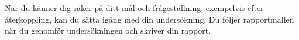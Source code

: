 \documentclass[a4paper]{miunasgn}
\begin{document}
När du känner dig säker på ditt mål och frågeställning, exempelvis efter 
återkoppling, kan du sätta igång med din undersökning.
Du följer rapportmallen när du genomför undersökningen och skriver din rapport.

\begin{comment}
The topic should be comparative analyses of (minimum two) different 
technologies.  Here are four possible alternatives: 

Compare two data communication standards. Explain their basic principles with 
your own words, and draw your own conclusions about their advantages and 
disadvantages, as well as which of them are expected to be improved in couple 
of years. http://wikipedia.org , and the course book can be used as resources.  
If there are RFCs for these standards (Request for Comments – which exist for 
the standards at the network and higher layers), read them. RFC are normally 
easy to read. The standards on physical layer or data‐link layer, for example 
IEEE standards are often RFCs, but that would be more difficult to understand 
than for example the transport protocols UDP and TCP or the e‐mail protocols 
POP3 and IMAP4.  You can even compare two xDSL – modem standards (for example 
ADSL2+ and VDSL2), or different wireless communication schemes (for example 
IEEE802.11a versus b, different security schemes for wireless LAN, Bluetooth 
versus IRDA, etc.). Here you will probably find the most difficult to read the 
documents about the standard. Describe their advantages and disadvantages.  
Draw your own conclusions about when the respective protocol is most convenient 
to be used and what is expected to be largely used in the coming years. 

Test and compare two types of software in the area of data communication.  
Install and test two comparable software packages, for example two firewalls, 
two instant message‐programs, two IP telephony programs, etc. You can use 
a freeware, shareware or demo versions of commercial packages. One site that 
offers downloads www.download.com. Once you decide what you are going to 
compare, try to find out the protocols and other paradigms used in each of 
them. Evaluate their usability, functionality and performance, for example in 
a specific usage scenario or for specific user group. Criticize the marketing 
motivations for the developers. Compile your thoughts about both programs 
‐ advantages, disadvantages and performance‐ into a table or a bulleted list, 
and draw conclusions about which of the programs is the best taking into 
account all the properties, or according to your own beliefs will dominate the 
market in the coming years.


\end{comment}
\end{document}

